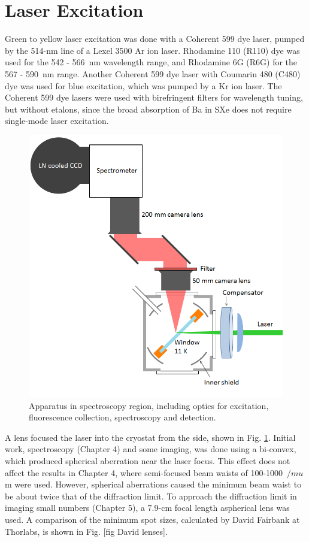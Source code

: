 
\section{Laser Excitation}

Green to yellow laser excitation was done with a Coherent 599 dye laser, pumped by the 514-nm line of a Lexel 3500 Ar ion laser.  Rhodamine 110 (R110) dye was used for the 542 - 566~nm wavelength range, and Rhodamine 6G (R6G) for the 567 - 590~nm range.  Another Coherent 599 dye laser with Coumarin 480 (C480) dye was used for blue excitation, which was pumped by a Kr ion laser.  The Coherent 599 dye lasers were used with birefringent filters for wavelength tuning, but without etalons, since the broad absorption of Ba in SXe does not require single-mode laser excitation.

\begin{figure} %
        \centering
                \includegraphics[width=.7\textwidth]{figures/window_etc_justOptics.png}
                \caption{Apparatus in spectroscopy region, including optics for excitation, fluorescence collection, spectroscopy and detection.}
\label{fig:endOfBeamOptics}
\end{figure}

A lens focused the laser into the cryostat from the side, shown in Fig. \ref{fig:endOfBeamOptics}.  Initial work, spectroscopy (Chapter 4) and some imaging, was done using a bi-convex, which produced spherical aberration near the laser focus.  This effect does not affect the results in Chapter 4, where semi-focused beam waists of 100-1000~$/mu$m were used.  However, spherical aberrations caused the minimum beam waist to be about twice that of the diffraction limit.  To approach the diffraction limit in imaging small numbers (Chapter 5), a 7.9-cm focal length aspherical lens was used.  A comparison of the minimum spot sizes, calculated by David Fairbank at Thorlabs, is shown in Fig. [fig David lenses].


